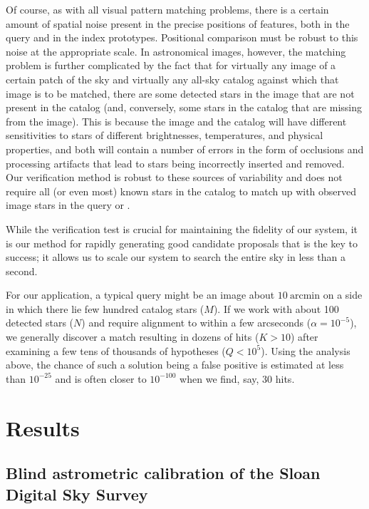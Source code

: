 \documentclass[12pt,preprint]{aastex}
\newcommand{\unit}[1]{\mathrm{#1}}
\renewcommand{\%}{\percent}
\renewcommand{\arcmin}{\unit{arcmin}}
\begin{document}
Of course, as with all visual pattern matching problems, there is a
certain amount of spatial noise present in the precise positions of
features, both in the query and in the index prototypes. Positional
comparison must be robust to this noise at the appropriate scale.  In
astronomical images, however, the matching problem is further
complicated by the fact that for virtually any image of a certain
patch of the sky and virtually any all-sky catalog against which that
image is to be matched, there are some detected stars in the image
that are not present in the catalog (and, conversely, some stars in
the catalog that are missing from the image). This is because the
image and the catalog will have different sensitivities to stars of
different brightnesses, temperatures, and physical properties, and
both will contain a number of errors in the form of occlusions and
processing artifacts that lead to stars being incorrectly inserted and
removed.  Our verification method is robust to these sources of variability
and does not require all (or even most) known stars in the
catalog to match up with observed image stars in the query or
.

While the verification test is crucial for maintaining the fidelity of
our system, it is our method for rapidly generating good candidate
proposals that is the key to success; it allows us to scale our system
to search the entire sky in less than a second.

For our application, a typical query might be an image about
$10~\arcmin$
on a side in which there lie few hundred catalog stars
($M$). If we work with about 100 detected stars ($N$) and require
alignment to within a few arcseconds ($\alpha=10^{-5}$), we generally
discover a match resulting in dozens of hits ($K>10$) after examining
a few tens of thousands of hypotheses ($Q<10^5$). Using the analysis
above, the chance of such a solution being a false positive is
estimated at less than $10^{-25}$ and is often closer to $10^{-100}$
when we find, say, 30 hits.

\section{Results}

\subsection{Blind astrometric calibration of the Sloan Digital Sky Survey}
\end{document}
